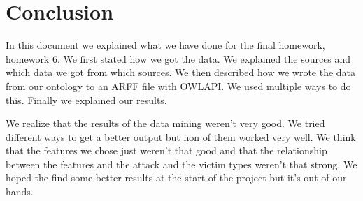\documentclass[a4]{article}
\begin{document}
\section{Conclusion}
\label{sec:conclusion}
In this document we explained what we have done for the final homework, homework 6. We first stated how we got the data. We explained the sources and which data we got from which sources. We then described how we wrote the data from our ontology to an ARFF file with OWLAPI. We used multiple ways to do this. Finally we explained our results.\par
We realize that the results of the data mining weren't very good. We tried different ways to get a better output but non of them worked very well. We think that the features we chose just weren't that good and that the relationship between the features and the attack and the victim types weren't that strong. We hoped the find some better results at the start of the project but it's out of our hands.
\printbibliography
\end{document}
